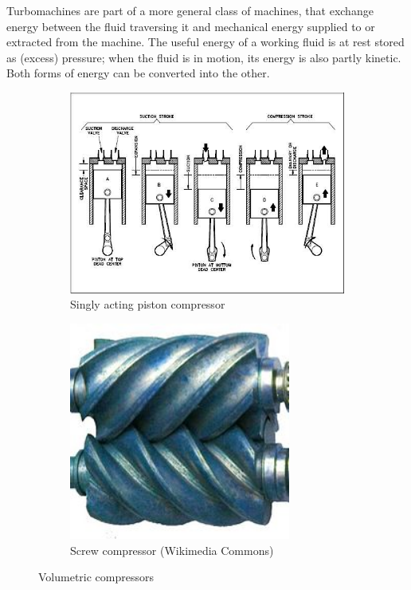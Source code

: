 

Turbomachines are part of a more general class of machines, that
exchange energy between the fluid traversing it and mechanical energy
supplied to or extracted from the machine. The useful energy of a
working fluid is at rest stored as (excess) pressure; when the fluid
is in motion, its energy is also partly kinetic. Both forms of energy
can be converted into the other.
\begin{figure}[!h]
  \centering
  \begin{subfigure}{0.49\textwidth}
    \includegraphics[width=\textwidth]{introduction/pistonCompressor.png}
    \caption{Singly acting piston compressor}
  \end{subfigure}
  \begin{subfigure}{0.49\textwidth}
    \hfill
    \includegraphics[width=0.8\textwidth]{introduction/LysholmScrewCompressor.png}
    \caption{Screw compressor (Wikimedia Commons)}
  \end{subfigure}
  \caption{Volumetric compressors}
  \label{fig:volumetricCompressors}
\end{figure}

